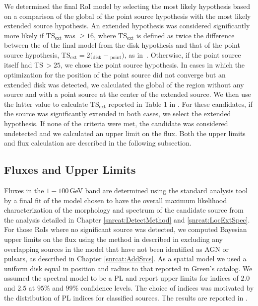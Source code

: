 
We determined the final RoI model by selecting the most likely hypothesis based on a comparison of the \gtlike{} global \logL{} of the point source hypothesis with the most likely extended source hypothesis. An extended hypothesis was considered significantly more likely if $\mathrm{TS_{ext}}$ was $\geq 16$, where $\mathrm{TS_{ext}}$ is defined as twice the difference between the \logL{} of the final model from the disk hypothesis and that of the point source hypothesis, $\mathrm{TS_{ext}} =  2 ($\logL{}$_{\mathrm{disk}}-$\logL{}$_{\mathrm{point}})$, as in~\citet{Lande12}. Otherwise, if the point source itself had TS\,$>25$, we chose the point source hypothesis. In cases in which the optimization for the position of the point source did not converge but an extended disk was detected, we calculated the global \logL{} of the region without any source and with a point source at the center of the extended source. We then use the latter value to calculate $\mathrm{TS_{ext}}$ reported in Table 1 in \cite{snrCat}. For these candidates, if the source was significantly extended in both cases, we select the extended hypothesis. If none of the criteria were met, the candidate was considered undetected and we calculated an upper limit on the flux. Both the upper limits and flux calculation are described in the following subsection.

\subsection{Fluxes and Upper Limits}\label{snrcat:FluxULs}
Fluxes in the $1-100$\,GeV band are determined using the standard analysis tool \gtlike{} by a final fit of the model chosen to have the overall maximum likelihood characterization of the morphology and spectrum of the candidate source from the analysis detailed in Chapter \ref{snrcat:DetectMethod} and \ref{snrcat:LocExtSpec}. For those RoIs where no significant source was detected, we computed Bayesian upper limits on the flux using the method in described in \citet{Helene83} excluding any overlapping sources in the model that have not been identified as AGN or pulsars, as described in Chapter \ref{snrcat:AddSrcs}. As a spatial model we used a uniform disk equal in position and radius to that reported in Green's catalog. We assumed the spectral model to be a PL and report upper limits for indices of $2.0$ and $2.5$ at $95\%$ and $99\%$ confidence levels. The choice of indices was motivated by the distribution of PL indices for classified sources. The results are reported in \cite{snrCat}.

